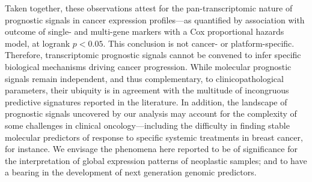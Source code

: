 Taken together, these observations attest for the pan-transcriptomic nature of
prognostic signals in cancer expression profiles---as quantified by association
with outcome of single- and multi-gene markers with a Cox proportional hazards
model, at logrank $p<0.05$.  This conclusion is not cancer- or
platform-specific.  Therefore, transcriptomic prognostic signals cannot be
convened to infer specific biological mechanisms driving cancer progression.
While molecular prognostic signals remain independent, and thus complementary,
to clinicopathological parameters, their ubiquity is in agreement with the
multitude of incongruous predictive signatures reported in the
literature.\cite{gevaert_prediction_2009,chibon_cancer_2013} In addition, the
landscape of prognostic signals uncovered by our analysis may account for the
complexity of some challenges in clinical oncology---including the difficulty in
finding stable molecular predictors of response to specific systemic treatments
in breast cancer, for instance.\cite{reis-filho_gene_2011} We envisage the
phenomena here reported to be of significance for the interpretation of global
expression patterns of neoplastic samples; and to have a bearing in the
development of next generation genomic predictors.






